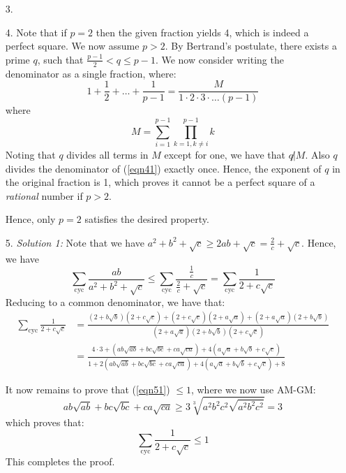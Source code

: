 \documentclass[a4paper, 12pt]{article}
\begin{document}
\begin{enumerate}
    
    \item[3.] 
    
    
    \item[4.] Note that if $p=2$ then the given fraction yields 4, which is indeed a perfect square. We now assume $p > 2$. By Bertrand's postulate, there exists a prime $q$, such that $\frac{p-1}{2} < q \leq p-1$. We now consider writing the denominator as a single fraction, where:
    \begin{equation} \label{eqn41}
        1+\frac{1}{2}+\dots+\frac{1}{p-1} = \frac{M}{1 \cdot 2 \cdot 3 \cdot \dots (p-1)}
    \end{equation}
    where
    $$ M = \sum_{i=1}^{p-1}  \prod_{k=1, k \neq i}^{p-1} k $$
    Noting that $q$ divides all terms in $M$ except for one, we have that $q \not | M$. Also $q$ divides the denominator of (\ref{eqn41}) exactly once. Hence, the exponent of $q$ in the original fraction is 1, which proves it cannot be a perfect square of a \textit{rational} number if $p>2$.
    
    Hence, only $p=2$ satisfies the desired property.
    

    \item[5.]  %
    \emph{Solution 1:} Note that we have $a^2 + b^2 + \sqrt{c} \geq 2ab + \sqrt{c} = \frac{2}{c} + \sqrt{c}$. Hence, we have
    $$ \sum_\textrm{cyc} \frac {ab}{a^2 + b^2 + \sqrt {c}} \leq \sum_\textrm{cyc} \frac{\frac{1}{c}}{\frac{2}{c} + \sqrt{c}} = \sum_\textrm{cyc} \frac{1}{2 + c\sqrt{c}} $$
    Reducing to a common denominator, we have that:
    \begin{align}
        \sum_\textrm{cyc} \frac{1}{2 + c\sqrt{c}} &= \frac{(2 + b \sqrt{b})(2 + c \sqrt{c}) + (2 + c \sqrt{c})(2 + a \sqrt{a}) + (2 + a \sqrt{a})(2 + b \sqrt{b})}{(2 + a \sqrt{a})(2 + b \sqrt{b})(2 + c \sqrt{c})} \nonumber \\
        &= \frac{4 \cdot 3 + (ab\sqrt{ab} + bc\sqrt{bc} + ca\sqrt{ca}) + 4(a\sqrt{a} + b\sqrt{b} + c\sqrt{c})}{1 + 2(ab\sqrt{ab} + bc\sqrt{bc} + ca\sqrt{ca}) + 4(a\sqrt{a} + b\sqrt{b} + c\sqrt{c}) + 8} \label{eqn51}
    \end{align} 
    
    It now remains to prove that (\ref{eqn51}) $ \leq 1$, where we now use AM-GM:
    $$  ab\sqrt {ab} + bc\sqrt {bc} + ca\sqrt {ca} \geq 3 \sqrt [3]{a^2b^2c^2\sqrt {a^2b^2c^2}} = 3 $$
    which proves that:
    $$ \sum_\textrm{cyc} \frac{1}{2 + c\sqrt{c}} \leq 1 $$
    This completes the proof.
    

\end{enumerate}
\end{document}
